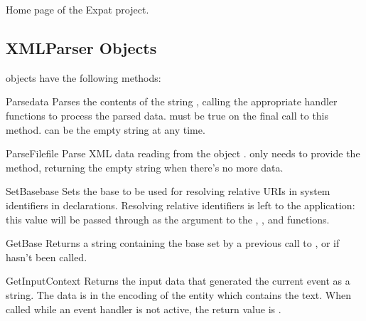 \begin{seealso}
           {Home page of the Expat project.}
\end{seealso}


\subsection{XMLParser Objects \label{xmlparser-objects}}

 objects have the following methods:

\begin{methoddesc}[xmlparser]{Parse}{data}
Parses the contents of the string , calling the appropriate
handler functions to process the parsed data.   must be
true on the final call to this method.   can be the empty
string at any time.
\end{methoddesc}

\begin{methoddesc}[xmlparser]{ParseFile}{file}
Parse XML data reading from the object .   only
needs to provide the  method, returning the
empty string when there's no more data.
\end{methoddesc}

\begin{methoddesc}[xmlparser]{SetBase}{base}
Sets the base to be used for resolving relative URIs in system
identifiers in declarations.  Resolving relative identifiers is left
to the application: this value will be passed through as the
 argument to the ,
, and
 functions.
\end{methoddesc}

\begin{methoddesc}[xmlparser]{GetBase}{}
Returns a string containing the base set by a previous call to
, or  if 
 hasn't been called.
\end{methoddesc}

\begin{methoddesc}[xmlparser]{GetInputContext}{}
Returns the input data that generated the current event as a string.
The data is in the encoding of the entity which contains the text.
When called while an event handler is not active, the return value is
.
\end{methoddesc}

